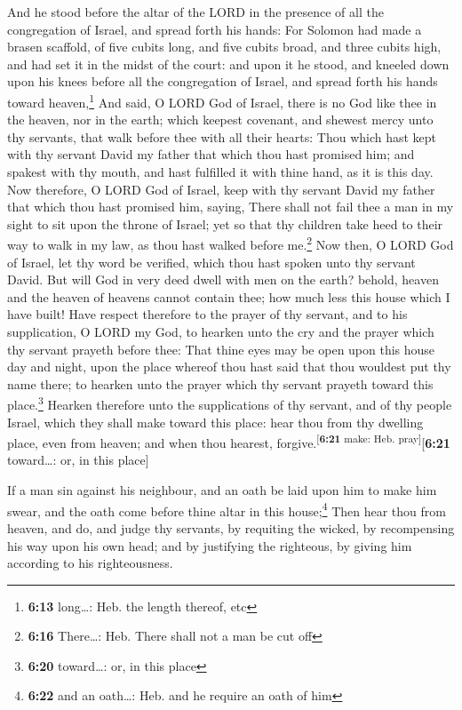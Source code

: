  And he stood before the altar of the LORD in the
presence of all the congregation of Israel, and spread forth his hands:
 For Solomon had made a brasen scaffold, of five cubits
long, and five cubits broad, and three cubits high, and had set it in
the midst of the court: and upon it he stood, and kneeled down upon his
knees before all the congregation of Israel, and spread forth his hands
toward heaven,\footnote{\textbf{6:13} long\ldots: Heb. the length
  thereof, etc}  And said, O LORD God of Israel, there is
no God like thee in the heaven, nor in the earth; which keepest
covenant, and shewest mercy unto thy servants, that walk before thee
with all their hearts:  Thou which hast kept with thy
servant David my father that which thou hast promised him; and spakest
with thy mouth, and hast fulfilled it with thine hand, as it is this
day.  Now therefore, O LORD God of Israel, keep with thy
servant David my father that which thou hast promised him, saying, There
shall not fail thee a man in my sight to sit upon the throne of Israel;
yet so that thy children take heed to their way to walk in my law, as
thou hast walked before me.\footnote{\textbf{6:16} There\ldots: Heb.
  There shall not a man be cut off}  Now then, O LORD God
of Israel, let thy word be verified, which thou hast spoken unto thy
servant David.  But will God in very deed dwell with men
on the earth? behold, heaven and the heaven of heavens cannot contain
thee; how much less this house which I have built!  Have
respect therefore to the prayer of thy servant, and to his supplication,
O LORD my God, to hearken unto the cry and the prayer which thy servant
prayeth before thee:  That thine eyes may be open upon
this house day and night, upon the place whereof thou hast said that
thou wouldest put thy name there; to hearken unto the prayer which thy
servant prayeth toward this place.\footnote{\textbf{6:20} toward\ldots:
  or, in this place}  Hearken therefore unto the
supplications of thy servant, and of thy people Israel, which they shall
make toward this place: hear thou from thy dwelling place, even from
heaven; and when thou hearest, forgive.\textsuperscript{{[}\textbf{6:21}
make: Heb. pray{]}}{[}\textbf{6:21} toward\ldots: or, in this place{]}

 If a man sin against his neighbour, and an oath be laid
upon him to make him swear, and the oath come before thine altar in this
house;\footnote{\textbf{6:22} and an oath\ldots: Heb. and he require an
  oath of him}  Then hear thou from heaven, and do, and
judge thy servants, by requiting the wicked, by recompensing his way
upon his own head; and by justifying the righteous, by giving him
according to his righteousness.

